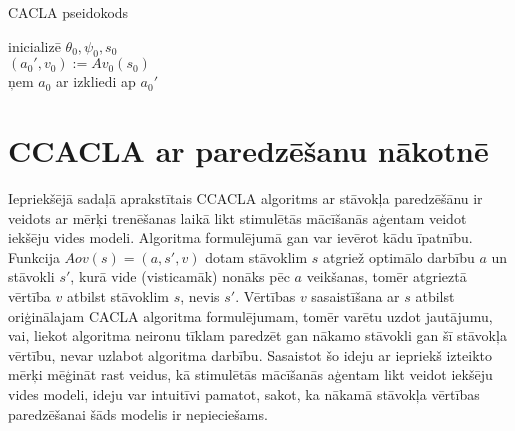 \documentclass{ludis} %
\begin{document}
\begin{spacing}{1}
\begin{algorithm}
\caption{CACLA pseidokods}\label{alg:ccacla-state}
inicializē $\theta_0, \psi_0, s_0$ \\
$(a_0', v_0) := Av_0(s_0)$ \\
ņem $a_0$ ar izkliedi ap $a_0'$ \\
\end{algorithm}
\end{spacing}

\section{CCACLA ar paredzēšanu nākotnē}
Iepriekšējā sadaļā aprakstītais CCACLA algoritms ar stāvokļa paredzēšānu ir
veidots ar mērķi trenēšanas laikā likt stimulētās mācīšanās aģentam veidot
iekšēju vides modeli. Algoritma formulējumā gan var ievērot kādu īpatnību.
Funkcija $Aov(s) = (a, s', v)$ dotam stāvoklim $s$ atgriež optimālo darbību $a$
un stāvokli $s'$, kurā vide (visticamāk) nonāks pēc $a$ veikšanas, tomēr
atgrieztā vērtība $v$ atbilst stāvoklim $s$, nevis $s'$. Vērtības $v$
sasaistīšana ar $s$ atbilst oriģinālajam CACLA algoritma formulējumam, tomēr
varētu uzdot jautājumu, vai, liekot algoritma neironu tīklam paredzēt gan nākamo
stāvokli gan šī stāvokļa vērtību, nevar uzlabot algoritma darbību. Sasaistot šo
ideju ar iepriekš izteikto mērķi mēģināt rast veidus, kā stimulētās mācīšanās
aģentam likt veidot iekšēju vides modeli, ideju var intuitīvi pamatot, sakot, ka
nākamā stāvokļa vērtības paredzēšanai šāds modelis ir nepieciešams.
\end{document}
